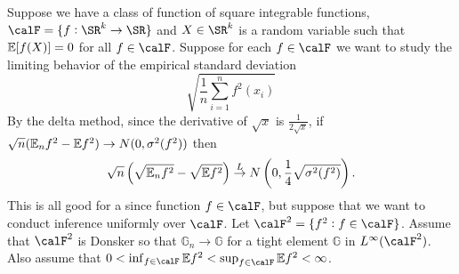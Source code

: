 \begin{example}
	\label{ex:uniform-variance-delta-method}
	Suppose we have a class of function of square integrable functions, \(\calF=\{f:\SR^k\to \SR\}\) and \(X\in \SR^k\) is a random variable such that \(\mathbb{E}[f(X)]=0\) for all \(f\in\calF\). Suppose for each \(f\in\calF\) we want to study the limiting behavior of the empirical standard deviation \[\sqrt{\frac{1}{n}\sum_{i=1}^n f^2(x_i)}\]
	By the delta method, since the derivative of \(\sqrt{x}\) is \(\frac{1}{2\sqrt{x}}\), if \(\sqrt{n}(\mathbb{E}_n f^2 -\mathbb{E} f^2)\to N(0,\sigma^2(f^2))\) then
	\[
		\sqrt{n}\left(\sqrt{\mathbb{E}_n f^2}-\sqrt{\mathbb{E} f^2}\right)\overset{L}{\to} N\left(0, \frac{1}{4}\sqrt{\sigma^2(f^2)}\right)	
	.\] 
	This is all good for a since function \(f\in \calF\), but suppose that we want to conduct inference uniformly over \(\calF\).  Let \(\calF^2 = \{f^2 : f\in\calF\}\). Assume that \(\calF^2\) is Donsker so that  \(\mathbb{G}_n\to\mathbb{G}\) for a tight element \(\mathbb{G}\) in \(L^\infty(\calF^2)\).  Also assume that \(0 < \inf_{f\in\calF}\E f^2<\sup_{f\in\calF}\E f^2<\infty\). 


\end{example}
